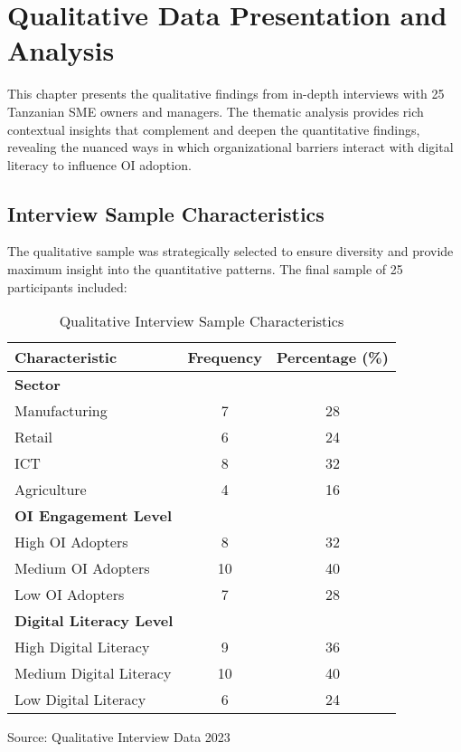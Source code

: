 \chapter{Qualitative Data Presentation and Analysis}

This chapter presents the qualitative findings from in-depth interviews with 25 Tanzanian SME owners and managers. The thematic analysis provides rich contextual insights that complement and deepen the quantitative findings, revealing the nuanced ways in which organizational barriers interact with digital literacy to influence OI adoption.

\section{Interview Sample Characteristics}

The qualitative sample was strategically selected to ensure diversity and provide maximum insight into the quantitative patterns. The final sample of 25 participants included:

\begin{table}[H]
\centering
\caption{Qualitative Interview Sample Characteristics}
\label{tab:qual_sample}
\begin{tabular}{@{}lcc@{}}
\toprule
\textbf{Characteristic} & \textbf{Frequency} & \textbf{Percentage (\%)} \\
\midrule
\textbf{Sector} & & \\
Manufacturing & 7 & 28 \\
Retail & 6 & 24 \\
ICT & 8 & 32 \\
Agriculture & 4 & 16 \\
\midrule
\textbf{OI Engagement Level} & & \\
High OI Adopters & 8 & 32 \\
Medium OI Adopters & 10 & 40 \\
Low OI Adopters & 7 & 28 \\
\midrule
\textbf{Digital Literacy Level} & & \\
High Digital Literacy & 9 & 36 \\
Medium Digital Literacy & 10 & 40 \\
Low Digital Literacy & 6 & 24 \\
\bottomrule
\end{tabular}
\begin{tablenotes}
\item Source: Qualitative Interview Data 2023
\end{tablenotes}
\end{table}

